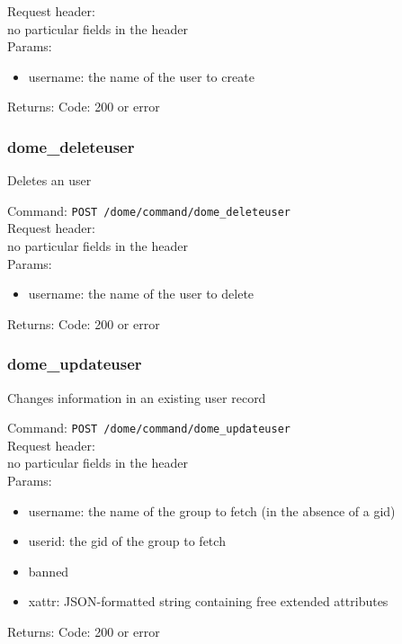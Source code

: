 \documentclass[a4paper,10pt]{scrreprt}
\begin{document}
Request header:\\
no particular fields in the header\\

Params:
\begin{itemize}
 \item username: the name of the user to create
\end{itemize}

Returns:
Code: 200 or error


\subsubsection{dome\_deleteuser}

Deletes an user

Command:
\lstinline"POST /dome/command/dome_deleteuser"\\

Request header:\\
no particular fields in the header\\

Params:
\begin{itemize}
 \item username: the name of the user to delete
\end{itemize}

Returns:
Code: 200 or error


\subsubsection{dome\_updateuser}

Changes information in an existing user record

Command:
\lstinline"POST /dome/command/dome_updateuser"\\

Request header:\\
no particular fields in the header\\

Params:
\begin{itemize}
 \item username: the name of the group to fetch (in the absence of a gid)
 \item userid: the gid of the group to fetch
 \item banned
 \item xattr: JSON-formatted string containing free extended attributes
\end{itemize}

Returns:
Code: 200 or error
\end{document}
